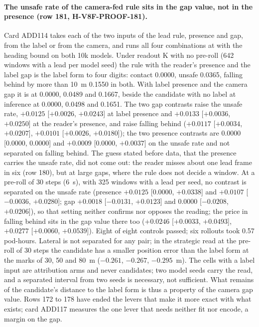 \paragraph{The unsafe rate of the camera-fed rule sits in the gap value, not in the presence (row 181, H-V8F-PROOF-181).} Card ADD114 takes each of the two inputs of the lead rule, presence and gap, from the label or from the camera, and runs all four combinations at  with the heading bound on both 10k models. Under readout K with no pre-roll (642 windows with a lead per model seed) the rule with the reader's presence and the label gap is the label form to four digits: contact 0.0000, unsafe 0.0365, falling behind by more than 10~m 0.1550 in both. With label presence and the camera gap it is at 0.0000, 0.0489 and 0.1667, beside the candidate with no label at inference at 0.0000, 0.0498 and 0.1651. The two gap contrasts raise the unsafe rate, $+0.0125$ [$+0.0026$, $+0.0243$] at label presence and $+0.0133$ [$+0.0036$, $+0.0250$] at the reader's presence, and raise falling behind ($+0.0117$ [$+0.0034$, $+0.0207$], $+0.0101$ [$+0.0026$, $+0.0180$]); the two presence contrasts are 0.0000 [0.0000, 0.0000] and $+0.0009$ [0.0000, $+0.0037$] on the unsafe rate and not separated on falling behind. The guess stated before data, that the presence carries the unsafe rate, did not come out: the reader misses about one lead frame in six (row 180), but at large gaps, where the rule does not decide a window. At a pre-roll of 30 steps (6~s), with 325 windows with a lead per seed, no contrast is separated on the unsafe rate (presence $+0.0125$ [0.0000, $+0.0338$] and $+0.0107$ [$-0.0036$, $+0.0280$]; gap $+0.0018$ [$-0.0131$, $+0.0123$] and 0.0000 [$-0.0208$, $+0.0206$]), so that setting neither confirms nor opposes the reading; the price in falling behind sits in the gap value there too ($+0.0246$ [$+0.0033$, $+0.0493$], $+0.0277$ [$+0.0060$, $+0.0539$]). Eight of eight controls passed; six rollouts took 0.57 pod-hours. Lateral is not separated for any pair; in the strategic read at the pre-roll of 30 steps the candidate has a smaller position error than the label form at the marks of 30, 50 and 80~m ($-0.261$, $-0.267$, $-0.295$~m). The cells with a label input are attribution arms and never candidates; two model seeds carry the read, and a separated interval from two seeds is necessary, not sufficient. What remains of the candidate's distance to the label form is thus a property of the camera gap value. Rows 172 to 178 have ended the levers that make it more exact with what exists; card ADD117 measures the one lever that needs neither fit nor encode, a margin on the gap.

